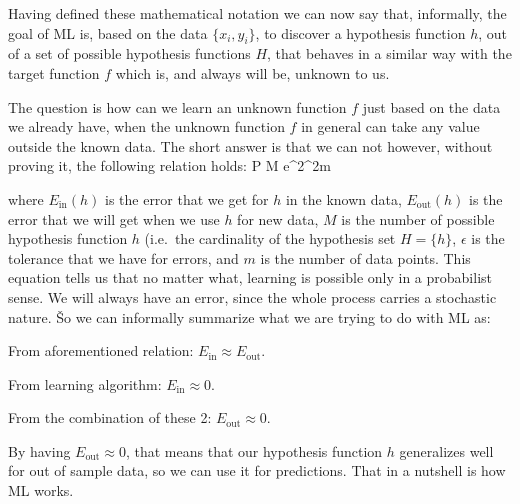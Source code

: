 Having defined these mathematical notation we can now say that, informally, the goal of ML is, based on
the data $\{ x_{i}, y_{i} \}$, to discover a hypothesis function $h$, out of a set of possible hypothesis functions $H$,
that behaves in a similar way with the target function $f$ which is, and always will be, unknown to us.


The question is how can we learn an unknown function $f$ just based on the data we already have, when the unknown
function $f$ in general can take any value outside the known data. The short answer is that we can not however,
without proving it, the following relation holds:
\bse
P   \cdot M \cdot e^{2\epsilon^2m}
\ese

where $ E_{\text{in}} (h)$ is the error that we get for $h$ in the known data, $E_{\text{out}} (h)$ is the error that
we will get when we use $h$ for new data, $M$ is the number of possible hypothesis function $h$ (i.e.\ the cardinality
of the hypothesis set $H = \{h\}$, $\epsilon$ is the tolerance that we have for errors, and $m$ is the number of data
points. This equation tells us that no matter what, learning is possible only in a probabilist sense. We will always
have an error, since the whole process carries a stochastic nature. \v

So we can informally summarize what we are trying to do with ML as:
\bit
\item From aforementioned relation: $E_{\text{in}} \approx E_{\text{out}}$.
\item From learning algorithm: $E_{\text{in}} \approx 0$.
\item From the combination of these 2: $E_{\text{out}} \approx 0$.
\eit

By having $E_{\text{out}} \approx 0$, that means that our hypothesis function $h$ generalizes well for out of sample
data, so we can use it for predictions. That in a nutshell is how ML works.